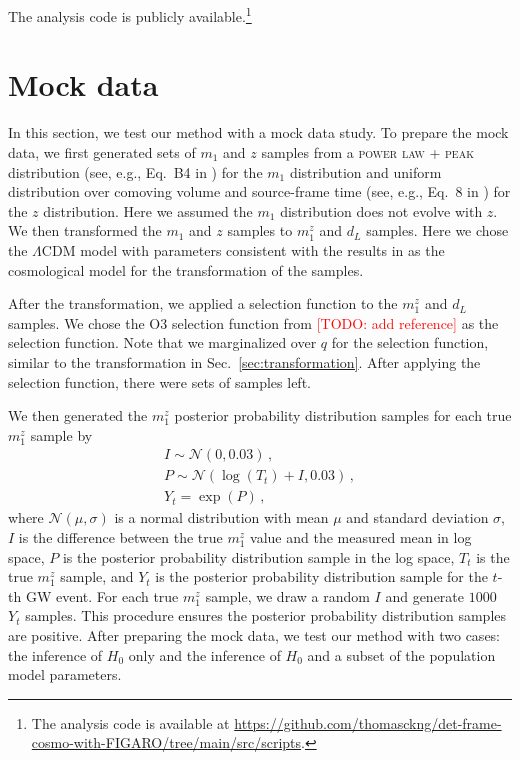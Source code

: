 \documentclass[twocolumn]{aastex631}
\newcommand{\todo}[1]{\textcolor{red}{[TODO: #1]}}
\begin{document}
The analysis code is publicly available.\footnote{The analysis code is available at \url{https://github.com/thomasckng/det-frame-cosmo-with-FIGARO/tree/main/src/scripts}.}

\section{Mock data}
\label{sec:mock_data}

In this section, we test our method with a mock data study.
To prepare the mock data, we first generated  sets of $m_1$ and $z$ samples from a \textsc{power law + peak} distribution (see, e.g., Eq.~B4 in \cite{KAGRA:2021duu}) for the $m_1$ distribution and uniform distribution over comoving volume and source-frame time (see, e.g., Eq.~8 in \cite{KAGRA:2021duu}) for the $z$ distribution.
Here we assumed the $m_1$ distribution does not evolve with $z$.
We then transformed the $m_1$ and $z$ samples to $m^z_1$ and $d_L$ samples.
Here we chose the $\Lambda$CDM model with parameters consistent with the results in \citet{Planck:2018vyg} as the cosmological model for the transformation of the samples.

After the transformation, we applied a selection function to the $m^z_1$ and $d_L$ samples.
We chose the O3 selection function from \todo{add reference} as the selection function.
Note that we marginalized over $q$ for the selection function, similar to the transformation in Sec.~\ref{sec:transformation}.
After applying the selection function, there were  sets of samples left.

We then generated the $m^z_1$ posterior probability distribution samples for each true $m^z_1$ sample by
\begin{gather*}
    I \sim \mathcal{N}(0, 0.03)\,,\\
    P \sim \mathcal{N}(\log(T_t)+I, 0.03)\,,\\
    Y_t = \exp(P)\,,
\end{gather*}
where $\mathcal{N}(\mu, \sigma)$ is a normal distribution with mean $\mu$ and standard deviation $\sigma$, $I$ is the difference between the true $m^z_1$ value and the measured mean in log space, $P$ is the posterior probability distribution sample in the log space, $T_t$ is the true $m^z_1$ sample, and $Y_t$ is the posterior probability distribution sample for the $t$-th \ac{GW} event.
For each true $m^z_1$ sample, we draw a random $I$ and generate $1000$ $Y_t$ samples.
This procedure ensures the posterior probability distribution samples are positive.
After preparing the mock data, we test our method with two cases: the inference of $H_0$ only and the inference of $H_0$ and a subset of the population model parameters.
\end{document}
